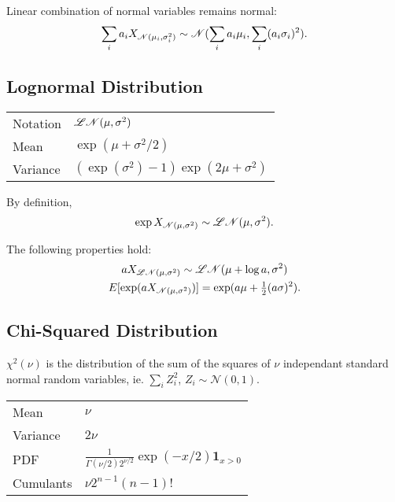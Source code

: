 \documentclass[10pt]{article}
\begin{document}
\begin{outline}
  \1 Linear combination of normal variables remains normal:
  \begin{equation*}
    \sum_i a_i X_{\mathscr{N}(\mu_i,\sigma^2_i)} \sim \mathscr{N}(\sum_ia_i\mu_i,\sum_i(a_i \sigma_i)^2).
  \end{equation*}
\end{outline}

\subsection{Lognormal Distribution}
\begin{center}
\begin{tabular}{ll}
  \toprule
  Notation & $\mathscr{LN}(\mu,\sigma^2)$\\
  Mean & $\exp(\mu+\sigma^2/2)$\\
  Variance & $(\exp(\sigma^2)-1)\exp(2\mu+\sigma^2)$\\
  \bottomrule
\end{tabular}
\end{center}

\begin{outline}
  \1 By definition,
  \begin{equation*}
    \exp X_{\mathscr{N}(\mu,\sigma^2)} \sim \mathscr{LN}(\mu,\sigma^2).
  \end{equation*}

  \1 The following properties hold:
  \begin{gather*}
    a X_{\mathscr{LN}(\mu,\sigma^2)} \sim \mathscr{LN}(\mu+\log a,\sigma^2)\\
    E[\exp(aX_{\mathscr{N}(\mu,\sigma^2)})] = \exp(a\mu + \tfrac{1}{2}(a\sigma)^2).
  \end{gather*}

\end{outline}


\subsection{Chi-Squared Distribution}
\begin{outline}
  \1 $\chi^2(\nu)$ is the distribution of the sum of the squares of $\nu$ independant
  standard normal random variables, ie. $\sum_i Z^2_i$, $Z_i\sim\mathscr{N}(0,1)$.

  \1 
  \begin{tabular}{ll} \toprule
    Mean & $\nu$\\
    Variance & $2\nu$\\
    PDF & $\displaystyle \frac{1}{\Gamma(\nu/2)2^{\nu/2}}\exp(-x/2) \bm
          1_{x>0}$\\
    Cumulants & $\nu 2^{n-1}(n-1)!$\\
    \bottomrule
  \end{tabular}
\end{outline}
\end{document}
